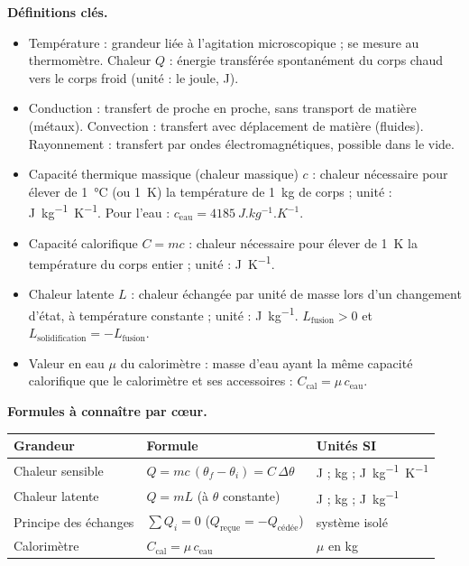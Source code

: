 \documentclass[11pt]{article}
\newcommand{\cle}[1]{{\popxbold\color{popdark}#1}}
\begin{document}
\begin{bilan}
\textbf{Définitions clés.}
\begin{itemize}
  \item \cle{Température} : grandeur liée à l'agitation microscopique ; se mesure au thermomètre. \cle{Chaleur} $Q$ : énergie transférée spontanément du corps chaud vers le corps froid (unité : le joule, J).
  \item \cle{Conduction} : transfert de proche en proche, sans transport de matière (métaux). \cle{Convection} : transfert avec déplacement de matière (fluides). \cle{Rayonnement} : transfert par ondes électromagnétiques, possible dans le vide.
  \item \cle{Capacité thermique massique} (chaleur massique) $c$ : chaleur nécessaire pour élever de \SI{1}{\celsius} (ou \SI{1}{K}) la température de \SI{1}{kg} de corps ; unité : \si{J.kg^{-1}.K^{-1}}. Pour l'eau : $c_{\text{eau}} = \SI{4185}{J.kg^{-1}.K^{-1}}$.
  \item \cle{Capacité calorifique} $C = mc$ : chaleur nécessaire pour élever de \SI{1}{K} la température du corps entier ; unité : \si{J.K^{-1}}.
  \item \cle{Chaleur latente} $L$ : chaleur échangée par unité de masse lors d'un changement d'état, à température constante ; unité : \si{J.kg^{-1}}. $L_{\text{fusion}} > 0$ et $L_{\text{solidification}} = -L_{\text{fusion}}$.
  \item \cle{Valeur en eau} $\mu$ du calorimètre : masse d'eau ayant la même capacité calorifique que le calorimètre et ses accessoires : $C_{\text{cal}} = \mu\, c_{\text{eau}}$.
\end{itemize}

\textbf{Formules à connaître par c\oe ur.}
\begin{center}
\begin{tabularx}{\linewidth}{|l|X|l|}\hline
\rowcolor{popblueL} \textbf{Grandeur} & \textbf{Formule} & \textbf{Unités SI} \\ \hline
Chaleur sensible & $Q = mc\,(\theta_f - \theta_i) = C\,\Delta\theta$ & J ; kg ; \si{J.kg^{-1}.K^{-1}} \\ \hline
Chaleur latente & $Q = mL$ (à $\theta$ constante) & J ; kg ; \si{J.kg^{-1}} \\ \hline
Principe des échanges & $\sum Q_i = 0$ \quad ($Q_{\text{re\c{c}ue}} = -Q_{\text{cédée}}$) & système isolé \\ \hline
Calorimètre & $C_{\text{cal}} = \mu\, c_{\text{eau}}$ & $\mu$ en kg \\ \hline
\end{tabularx}
\end{center}


\end{bilan}
\end{document}
